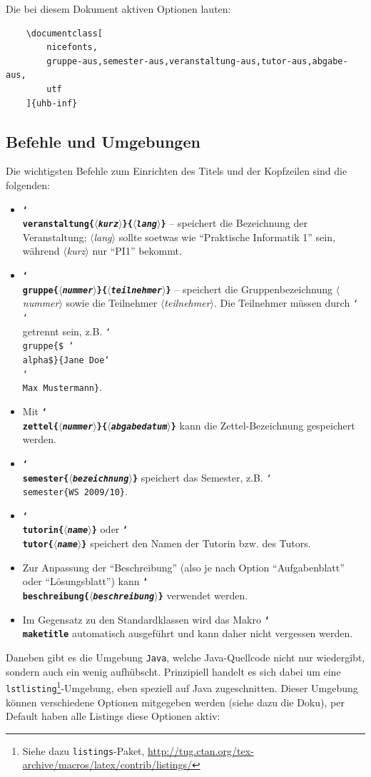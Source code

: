 \documentclass[palatino,gruppe-aus,semester-aus,veranstaltung-aus,abgabe-aus,tutor-aus,utf]{uhb-inf}
\def\option#1{\texttt{\bfseries #1}}
\def\cs#1{\char`\\#1}
\def\p#1{$\langle$\textit{#1}$\rangle$}
\def\pb#1{\{\p{#1}\}}
\begin{document}
\newpage

Die bei diesem Dokument aktiven Optionen lauten:

\begin{verbatim}
    \documentclass[
        nicefonts,
        gruppe-aus,semester-aus,veranstaltung-aus,tutor-aus,abgabe-aus,
        utf
    ]{uhb-inf}
\end{verbatim}

\subsection{Befehle und Umgebungen}

Die wichtigsten Befehle zum Einrichten des Titels und der Kopfzeilen sind die folgenden:

\begin{itemize}
	\item \option{\cs{veranstaltung}\pb{kurz}\pb{lang}} -- speichert die Bezeichnung der Veranstaltung; \p{lang} sollte soetwas wie "`Praktische Informatik 1"' sein, während \p{kurz} nur "`PI1"' bekommt.
	\item \option{\cs{gruppe}\pb{nummer}\pb{teilnehmer}} -- speichert die Gruppenbezeichnung \p{nummer} sowie die Teilnehmer \p{teilnehmer}. Die Teilnehmer müssen durch \texttt{\cs\cs{}} getrennt sein, z.B. \texttt{\cs{gruppe}\{\$ \cs{alpha}\$\}\{Jane Doe\cs\cs{}Max Mustermann\}}.
	\item Mit \option{\cs{zettel}\pb{nummer}\pb{abgabedatum}} kann die Zettel-Bezeichnung gespeichert werden.
	\item \option{\cs{semester}\pb{bezeichnung}} speichert das Semester, z.B. \texttt{\cs{semester}\{WS 2009/10\}}.
	\item \option{\cs{tutorin}\pb{name}} oder \option{\cs{tutor}\pb{name}} speichert den Namen der Tutorin bzw. des Tutors.
	\item Zur Anpassung der "`Beschreibung"' (also je nach Option "`Aufgabenblatt"' oder "`Lösungsblatt"') kann \option{\cs{beschreibung}\pb{beschreibung}} verwendet werden.
	\item Im Gegensatz zu den Standardklassen wird das Makro \option{\cs{maketitle}} automatisch ausgeführt und kann daher nicht vergessen werden.
\end{itemize}

Daneben gibt es die Umgebung \texttt{Java}, welche Java-Quellcode nicht nur wiedergibt, sondern auch ein wenig aufhübscht. Prinzipiell handelt es sich dabei um eine \texttt{lstlisting}\footnote{Siehe dazu \texttt{listings}-Paket, \url{http://tug.ctan.org/tex-archive/macros/latex/contrib/listings/}}-Umgebung, eben speziell auf Java zugeschnitten. Dieser Umgebung können verschiedene Optionen mitgegeben werden (siehe dazu die Doku), per Default haben alle Listings diese Optionen aktiv:
\end{document}
